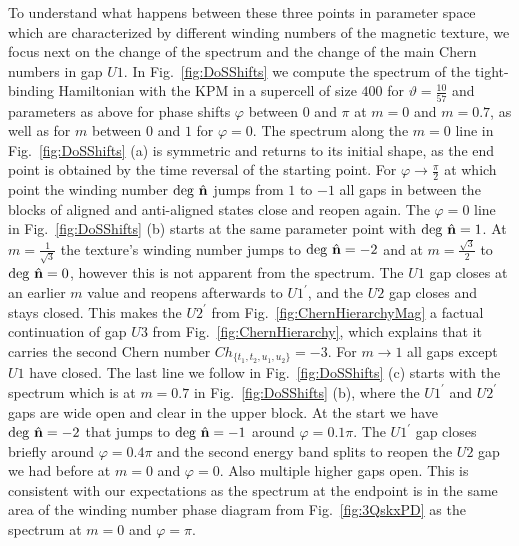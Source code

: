 \documentclass[submission, Phys]{SciPost}
\begin{document}
To understand what happens between these three points in parameter space which are characterized by different winding numbers of the magnetic texture, we focus next on the change of the spectrum and the change of the main Chern numbers in gap $U1$.
In Fig.~\ref{fig:DoSShifts} we compute the spectrum of the tight-binding Hamiltonian with the KPM in a supercell of size $400$ for $\vartheta=\frac{10}{57}$ and parameters as above for phase shifts $\varphi$ between $0$ and $\pi$ at $m=0$ and $m=0.7$, as well as for $m$ between $0$ and $1$ for $\varphi=0$.
The spectrum along the $m=0$ line in Fig.~\ref{fig:DoSShifts} (a) is symmetric and returns to its initial shape, as the end point is obtained by the time reversal of the starting point.
For $\varphi\to\frac{\pi}{2}$ at which point the winding number $\mathrm{deg}~\hat{\mathbf{n}}$ jumps from $1$ to $-1$ all gaps in between the blocks of aligned and anti-aligned states close and reopen again.
The $\varphi=0$ line in Fig.~\ref{fig:DoSShifts} (b) starts at the same parameter point with $\mathrm{deg}~\hat{\mathbf{n}}=1$.
At $m=\frac{1}{\sqrt{3}}$ the texture's winding number jumps to $\mathrm{deg}~\hat{\mathbf{n}}=-2$ and at $m=\frac{\sqrt{3}}{2}$ to $\mathrm{deg}~\hat{\mathbf{n}}=0$, however this is not apparent from the spectrum. The $U1$ gap closes at an earlier $m$ value and reopens afterwards to $U1^{\prime}$, and the $U2$ gap closes and stays closed.
This makes the $U2^{\prime}$ from Fig.~\ref{fig:ChernHierarchyMag} a factual  continuation of gap $U3$ from Fig.~\ref{fig:ChernHierarchy}, which explains that it carries the second Chern number $Ch_{\lbrace t_1, t_2, u_1, u_2 \rbrace }=-3$.
For $m\to1$ all gaps except $U1$ have closed.
The last line we follow in Fig.~\ref{fig:DoSShifts} (c) starts with the spectrum which is at $m=0.7$ in Fig.~\ref{fig:DoSShifts} (b), where the $U1^{\prime}$  and $U2^{\prime}$ gaps are wide open and clear in the upper block. At the start we have $\mathrm{deg}~\hat{\mathbf{n}}=-2$ that jumps to $\mathrm{deg}~\hat{\mathbf{n}}=-1$ around $\varphi=0.1\pi$. The $U1^{\prime}$  
gap closes briefly around $\varphi=0.4\pi$ and the second energy band splits to reopen the $U2$ gap we had before at $m=0$ and $\varphi=0$. Also multiple higher gaps open.
This is consistent with our expectations as the spectrum at the endpoint is in the same area of the winding number phase diagram from Fig.~\ref{fig:3QskxPD} as the spectrum at $m=0$ and $\varphi=\pi$.
\end{document}
